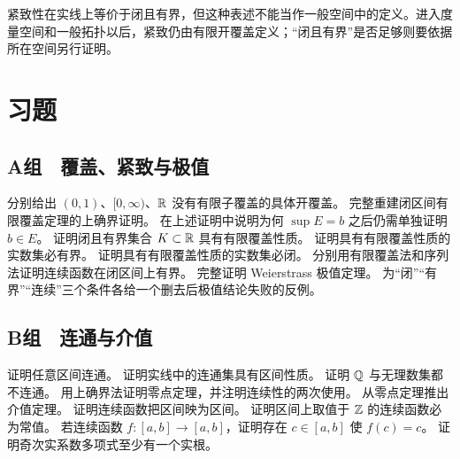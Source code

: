 紧致性在实线上等价于闭且有界，但这种表述不能当作一般空间中的定义。进入度量空间和一般拓扑以后，紧致仍由有限开覆盖定义；“闭且有界”是否足够则要依据所在空间另行证明。

\section*{习题}

\subsection*{A组　覆盖、紧致与极值}
\begin{enumerate}[label=\textbf{\thechapter.\arabic*.}]
   分别给出 \((0,1)\)、\([0,\infty)\)、\(\mathbb{R}\) 没有有限子覆盖的具体开覆盖。
   完整重建闭区间有限覆盖定理的上确界证明。
   在上述证明中说明为何 \(\sup E=b\) 之后仍需单独证明 \(b\in E\)。
   证明闭且有界集合 \(K\subset\mathbb{R}\) 具有有限覆盖性质。
   证明具有有限覆盖性质的实数集必有界。
   证明具有有限覆盖性质的实数集必闭。
   分别用有限覆盖法和序列法证明连续函数在闭区间上有界。
   完整证明 Weierstrass 极值定理。
   为“闭”“有界”“连续”三个条件各给一个删去后极值结论失败的反例。
\end{enumerate}

\subsection*{B组　连通与介值}
\begin{enumerate}[label=\textbf{\thechapter.\arabic*.},resume]
   证明任意区间连通。
   证明实线中的连通集具有区间性质。
   证明 \(\mathbb{Q}\) 与无理数集都不连通。
   用上确界法证明零点定理，并注明连续性的两次使用。
   从零点定理推出介值定理。
   证明连续函数把区间映为区间。
   证明区间上取值于 \(\mathbb{Z}\) 的连续函数必为常值。
   若连续函数 \(f:[a,b]\to[a,b]\)，证明存在 \(c\in[a,b]\) 使 \(f(c)=c\)。
   证明奇次实系数多项式至少有一个实根。
\end{enumerate}

